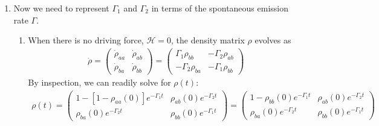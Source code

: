 \documentclass{article}
\theoremstyle{definition}
\newcommand{\ham}{\mathcal{H}}
\begin{document}
\begin{enumerate}[label=(\alph*)]
	\item Now we need to represent $\Gamma_1$ and $\Gamma_2$ in terms of the spontaneous emission rate $\Gamma$. 
	\begin{enumerate}[label=(\roman*)]
		\item When there is no driving force, $\ham = 0$, the density matrix $\rho$ evolves as
		\begin{align*}
		\dot\rho
		= \begin{pmatrix}
		\dot{\rho}_{aa} & \dot{\rho}_{ab} \\ \dot{\rho}_{ba} & \dot{\rho}_{bb}
		\end{pmatrix} 
		= \begin{pmatrix}
		\Gamma_1 \rho_{bb} & -\Gamma_2 \rho_{ab} \\ -\Gamma_2 \rho_{ba} & -\Gamma_1 \rho_{bb}
		\end{pmatrix}
		\end{align*}
		By inspection, we can readily solve for $\rho(t)$:
		\begin{align*}
		\rho(t) = \begin{pmatrix}
		1 - [1- \rho_{aa}(0)]e^{-\Gamma_1 t} & \rho_{ab}(0) e^{-\Gamma_2 t} \\ 
		\rho_{ba}(0)e^{-\Gamma_2 t} &  \rho_{bb}(0) e^{-\Gamma_1 t}
		\end{pmatrix} = \begin{pmatrix}
		1 - \rho_{bb}(0)e^{-\Gamma_1 t} & \rho_{ab}(0) e^{-\Gamma_2 t} \\ 
		\rho_{ba}(0)e^{-\Gamma_2 t} &  \rho_{bb}(0) e^{-\Gamma_1 t}
		\end{pmatrix}
		\end{align*}
		

\end{enumerate}
\end{enumerate}
\end{document}
